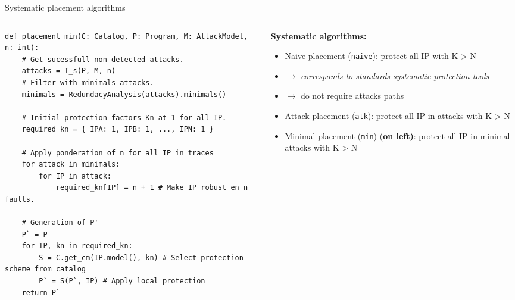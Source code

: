 \begin{frame}[fragile]{Systematic placement algorithms}
    \begin{columns}
        \begin{column}{0.5\textwidth}
            \begin{tiny}
                \lstset{style=custompython}
                \begin{lstlisting}
def placement_min(C: Catalog, P: Program, M: AttackModel, n: int):
    # Get sucessfull non-detected attacks.
    attacks = T_s(P, M, n)
    # Filter with minimals attacks.
    minimals = RedundacyAnalysis(attacks).minimals()
    
    # Initial protection factors Kn at 1 for all IP.
    required_kn = { IPA: 1, IPB: 1, ..., IPN: 1 }

    # Apply ponderation of n for all IP in traces
    for attack in minimals:
        for IP in attack:
            required_kn[IP] = n + 1 # Make IP robust en n faults.

    # Generation of P'
    P` = P
    for IP, kn in required_kn:
        S = C.get_cm(IP.model(), kn) # Select protection scheme from catalog
        P` = S(P`, IP) # Apply local protection        
    return P`    \end{lstlisting}
            \end{tiny}
        \end{column}
        \begin{column}{0.5\textwidth}
            \begin{tiny}
                \textbf{Systematic algorithms:}
                \begin{itemize}
                    \item Naive placement (\texttt{naive}): protect all IP with K > N
                    \item [] $\rightarrow$ \textit{corresponds to standards systematic protection tools}%
                    \item [] $\rightarrow$ do not require attacks paths
                    \item Attack placement (\texttt{atk}): protect all IP in attacks with K > N
                    \item Minimal placement  (\texttt{min}) (\textbf{on left)}: protect all IP in minimal attacks with K > N
                \end{itemize}
                

\end{tiny}
\end{column}
\end{columns}
\end{frame}
